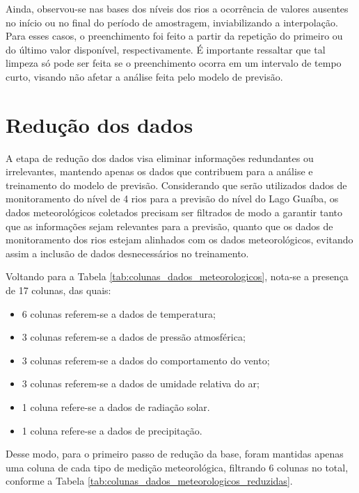Ainda, observou-se nas bases dos níveis dos rios a ocorrência de valores ausentes no início ou no final do período de amostragem, inviabilizando a interpolação. Para esses casos, o preenchimento foi feito a partir da repetição do primeiro ou do último valor disponível, respectivamente. É importante ressaltar que tal limpeza só pode ser feita se o preenchimento ocorra em um intervalo de tempo curto, visando não afetar a análise feita pelo modelo de previsão.

\section{Redução dos dados}

A etapa de redução dos dados visa eliminar informações redundantes ou irrelevantes, mantendo apenas os dados que contribuem para a análise e treinamento do modelo de previsão. Considerando que serão utilizados dados de monitoramento do nível de 4 rios para a previsão do nível do Lago Guaíba, os dados meteorológicos coletados precisam ser filtrados de modo a garantir tanto que as informações sejam relevantes para a previsão, quanto que os dados de monitoramento dos rios estejam alinhados com os dados meteorológicos, evitando assim a inclusão de dados desnecessários no treinamento. 

Voltando para a Tabela \ref{tab:colunas_dados_meteorologicos}, nota-se a presença de 17 colunas, das quais:

\begin{itemize}
	\item 6 colunas referem-se a dados de temperatura;
	\item 3 colunas referem-se a dados de pressão atmosférica;
	\item 3 colunas referem-se a dados do comportamento do vento;
	\item 3 colunas referem-se a dados de umidade relativa do ar;
	\item 1 coluna refere-se a dados de radiação solar.
	\item 1 coluna refere-se a dados de precipitação.
\end{itemize}

Desse modo, para o primeiro passo de redução da base, foram mantidas apenas uma coluna de cada tipo de medição meteorológica, filtrando 6 colunas no total, conforme a Tabela \ref{tab:colunas_dados_meteorologicos_reduzidas}. 

